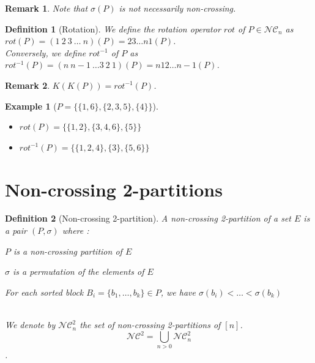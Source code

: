 \documentclass[12pt]{report}
\newtheorem{definition}{Definition}
\newtheorem*{example}{Example}
\newtheorem*{rem}{Remark}
\begin{document}
\begin{rem}
    Note that $\sigma (P)$ is \emph{not} necessarily
    non-crossing.
\end{rem}

\begin{definition}[Rotation]
    We define the \emph{rotation operator} $rot$ of
    $P \in \mathcal{NC}_n$ as $rot (P) = 
    (1\ 2\ 3\  \ldots \ n)(P) = 23 \ldots n1 (P)$.\\
    Conversely, we define $rot^{-1}$ of $P$ as
    $rot^{-1}(P) = (n\ n-1\ \ldots 3\ 2\ 1)(P) = 
    n12 \ldots n-1 (P)$.
\end{definition}

\begin{rem}
    $K (K (P)) = rot^{-1} (P)$.
\end{rem}

\begin{example}[$P = \{\{1, 6\}, \{2, 3, 5\}, \{4\}\}$]
    ~\\
    \begin{itemize}
        \item $rot (P) = \{\{1, 2\}, \{3, 4, 6\}, \{5\}\}$
        \item $rot^{-1}(P) = \{\{1, 2, 4\}, \{3\}, \{5, 6\}\}$
    \end{itemize}
    
\end{example}

\section{Non-crossing 2-partitions}

\begin{definition}[Non-crossing 2-partition]
    A \emph{non-crossing 2-partition} of a set $E$ is a pair $(P, \sigma)$
    where :\\
    \begin{itemize*}
        \item $P$ is a non-crossing partition of $E$\\
        \item $\sigma$ is a permutation of the elements of $E$\\
        \item For each \emph{sorted} block
            $B_i = \{b_1, \ldots, b_k\} \in P$, we have
            $\sigma (b_i) < \ldots < \sigma (b_k)$\\\\
    \end{itemize*}
    We denote by $\mathcal{NC}^2_n$ the set of non-crossing
    2-partitions of $[n]$.
    $$\mathcal{NC}^2 = \bigcup_{n > 0}{\mathcal{NC}^2_n}$$.
\end{definition}
\end{document}
